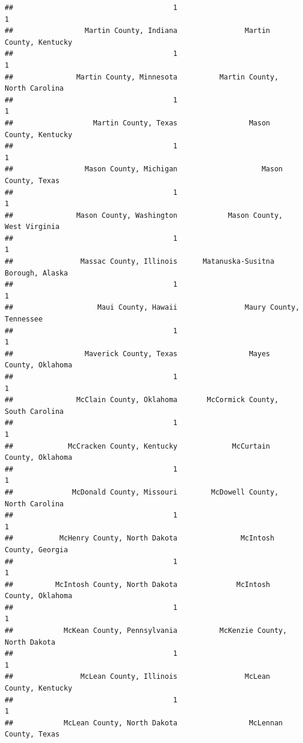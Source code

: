\documentclass[
]{article}
\begin{document}
\begin{verbatim}
##                                      1                                      1 
##                 Martin County, Indiana                Martin County, Kentucky 
##                                      1                                      1 
##               Martin County, Minnesota          Martin County, North Carolina 
##                                      1                                      1 
##                   Martin County, Texas                 Mason County, Kentucky 
##                                      1                                      1 
##                 Mason County, Michigan                    Mason County, Texas 
##                                      1                                      1 
##               Mason County, Washington            Mason County, West Virginia 
##                                      1                                      1 
##                Massac County, Illinois      Matanuska-Susitna Borough, Alaska 
##                                      1                                      1 
##                    Maui County, Hawaii                Maury County, Tennessee 
##                                      1                                      1 
##                 Maverick County, Texas                 Mayes County, Oklahoma 
##                                      1                                      1 
##               McClain County, Oklahoma       McCormick County, South Carolina 
##                                      1                                      1 
##             McCracken County, Kentucky             McCurtain County, Oklahoma 
##                                      1                                      1 
##              McDonald County, Missouri        McDowell County, North Carolina 
##                                      1                                      1 
##           McHenry County, North Dakota               McIntosh County, Georgia 
##                                      1                                      1 
##          McIntosh County, North Dakota              McIntosh County, Oklahoma 
##                                      1                                      1 
##            McKean County, Pennsylvania          McKenzie County, North Dakota 
##                                      1                                      1 
##                McLean County, Illinois                McLean County, Kentucky 
##                                      1                                      1 
##            McLean County, North Dakota                 McLennan County, Texas 

\end{verbatim}
\end{document}
